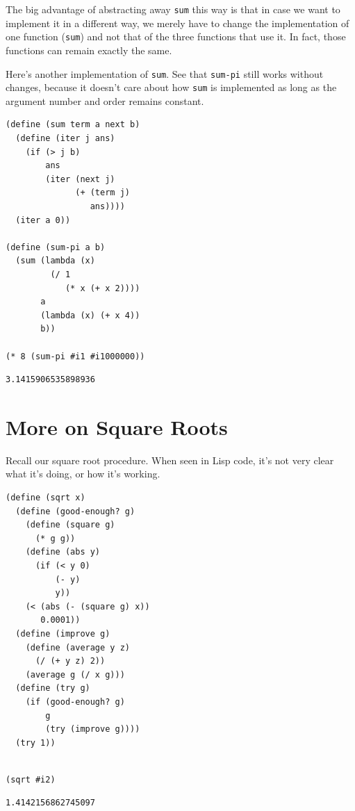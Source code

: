 \documentclass[9pt]{report}
\begin{document}
The big advantage of abstracting away \texttt{sum} this way is that in
case we want to implement it in a different way, we merely have to
change the implementation of one function (\texttt{sum}) and not that of
the three functions that use it. In fact, those functions can
remain exactly the same.

Here's another implementation of \texttt{sum}. See that \texttt{sum-pi} still
works without changes, because it doesn't care about how \texttt{sum} is
implemented as long as the argument number and order remains
constant.

\begin{verbatim}
(define (sum term a next b)
  (define (iter j ans)
    (if (> j b)
        ans
        (iter (next j)
              (+ (term j)
                 ans))))
  (iter a 0))

(define (sum-pi a b)
  (sum (lambda (x)
         (/ 1
            (* x (+ x 2))))
       a
       (lambda (x) (+ x 4))
       b))

(* 8 (sum-pi #i1 #i1000000))
\end{verbatim}

\begin{verbatim}
3.1415906535898936
\end{verbatim}

\section{More on Square Roots}
\label{sec:org5f6c4cf}

Recall our square root procedure. When seen in Lisp code, it's not
very clear what it's doing, or how it's working.

\begin{verbatim}
(define (sqrt x)
  (define (good-enough? g)
    (define (square g)
      (* g g))
    (define (abs y)
      (if (< y 0)
          (- y)
          y))
    (< (abs (- (square g) x))
       0.0001))
  (define (improve g)
    (define (average y z)
      (/ (+ y z) 2))
    (average g (/ x g)))
  (define (try g)
    (if (good-enough? g)
        g
        (try (improve g))))
  (try 1))
\end{verbatim}

\begin{verbatim}

(sqrt #i2)
\end{verbatim}

\begin{verbatim}
1.4142156862745097
\end{verbatim}
\end{document}
